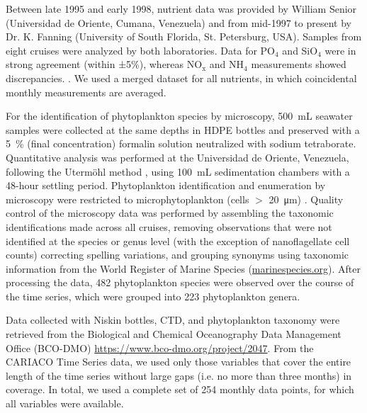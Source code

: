 \documentclass[draft]{agujournal2019}
\begin{document}
    Between late 1995 and early 1998, nutrient data was provided by William Senior (Universidad de Oriente, Cumana, Venezuela) and from mid-1997 to  present by Dr. K. Fanning (University of South Florida, St. Petersburg, USA). Samples from eight cruises were analyzed by both laboratories. Data for PO$_4$ and SiO$_4$ were in strong agreement (within ±5\%), whereas  NO$_\text{x}$ and NH$_4$ measurements showed discrepancies. \cite{taylor_ecosystem_2012}. We used a merged dataset for all nutrients, in which coincidental monthly measurements are averaged.
       
    For the identification of phytoplankton species by microscopy, \qty{500}{\milli\liter} seawater samples were collected at the same depths in HDPE bottles and preserved with a \qty{5}{\%} (final concentration) formalin solution neutralized with sodium tetraborate. Quantitative analysis was performed at the Universidad de Oriente, Venezuela, following the Utermöhl method \cite{hasle1978inverted}, using \qty{100}{\milli\liter} sedimentation chambers with a 48-hour settling period. Phytoplankton identification and enumeration by microscopy were restricted to microphytoplankton (cells $>$ \qty{20}{\micro \meter}) \cite{mutshinda_environmental_2013}.
    Quality control of the microscopy data was performed by assembling the taxonomic identifications made across all cruises, removing observations that were not identified at the species or genus level (with the exception of nanoflagellate cell counts) correcting spelling variations, and grouping synonyms using taxonomic information from the World Register of Marine Species (\url{marinespecies.org}). After processing the data, 482 phytoplankton species were observed over the course of the time series, which were grouped into 223 phytoplankton genera.

    
    Data collected with Niskin bottles, CTD, and phytoplankton taxonomy were retrieved from the Biological and Chemical Oceanography Data Management Office (BCO-DMO) \url{https://www.bco-dmo.org/project/2047}. 
    From the CARIACO Time Series data, we used only those variables that cover the entire length of the time series without large gaps (i.e. no more than three months) in coverage. In total, we used a complete set of 254 monthly data points, for which all variables were available.
\end{document}
